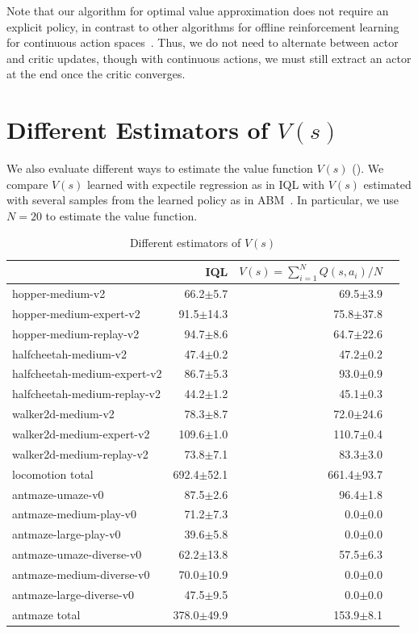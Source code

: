 Note that our algorithm for optimal value approximation does not require an explicit policy, in contrast to other algorithms for offline reinforcement learning for continuous action spaces~\citep{fujimoto2019off, fujimoto2021minimalist, wu2019behavior, kostrikov2021offline, kumar2019stabilizing, kumar2020conservative}. Thus, we do not need to alternate between actor and critic updates, though with continuous actions, we must still extract an actor at the end once the critic converges.

\section{Different Estimators of $V(s)$}

{
We also evaluate different ways to estimate the value function $V(s)$ (). We compare $V(s)$ learned with expectile regression as in IQL with $V(s)$ estimated with several samples from the learned policy as in ABM~\citep{siegel2020keep}. In particular, we use $N=20$ to estimate the value function.}


\begin{table}[!htp]\centering
\caption{Different estimators of $V(s)$}\label{tab:abm}
\scriptsize
\begin{tabular}{l|rrr}
&IQL & $V(s)=\sum_{i=1}^N Q(s,a_i) / N$ \\\hline
hopper-medium-v2 &66.2$\pm$5.7 &69.5$\pm$3.9 \\
hopper-medium-expert-v2 &91.5$\pm$14.3 &75.8$\pm$37.8 \\
hopper-medium-replay-v2 &94.7$\pm$8.6 &64.7$\pm$22.6 \\
halfcheetah-medium-v2 &47.4$\pm$0.2 &47.2$\pm$0.2 \\
halfcheetah-medium-expert-v2 &86.7$\pm$5.3 &93.0$\pm$0.9 \\
halfcheetah-medium-replay-v2 &44.2$\pm$1.2 &45.1$\pm$0.3 \\
walker2d-medium-v2 &78.3$\pm$8.7 &72.0$\pm$24.6 \\
walker2d-medium-expert-v2 &109.6$\pm$1.0 &110.7$\pm$0.4 \\
walker2d-medium-replay-v2 &73.8$\pm$7.1 &83.3$\pm$3.0 \\ \hline
locomotion total &692.4$\pm$52.1 &661.4$\pm$93.7 \\ \hline
antmaze-umaze-v0 &87.5$\pm$2.6 &96.4$\pm$1.8 \\
antmaze-medium-play-v0 &71.2$\pm$7.3 &0.0$\pm$0.0 \\
antmaze-large-play-v0 &39.6$\pm$5.8 &0.0$\pm$0.0 \\
antmaze-umaze-diverse-v0 &62.2$\pm$13.8 &57.5$\pm$6.3 \\
antmaze-medium-diverse-v0 &70.0$\pm$10.9 &0.0$\pm$0.0 \\
antmaze-large-diverse-v0 &47.5$\pm$9.5 &0.0$\pm$0.0 \\ \hline
antmaze total &378.0$\pm$49.9 &153.9$\pm$8.1 \\
\end{tabular}
\end{table}

